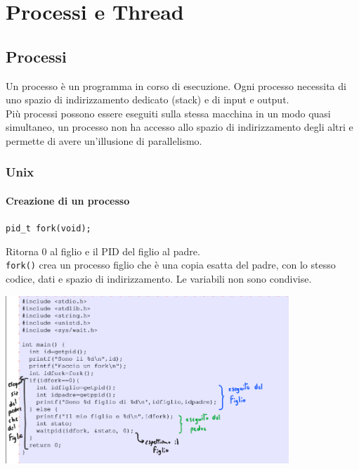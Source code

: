 \documentclass[12pt, a4paper]{report}
\begin{document}
    \newpage
    \tableofcontents
    \chapter{Processi e Thread}
        \section{Processi}
            Un processo è un programma in corso di esecuzione. Ogni processo necessita di uno spazio di indirizzamento dedicato (stack) e di input e output. \\
            Più processi possono essere eseguiti sulla stessa macchina in un modo quasi simultaneo, un processo non ha accesso allo spazio di indirizzamento degli altri e permette di avere un'illusione di parallelismo.
            \subsection{Unix}
                \subsubsection{Creazione di un processo}
                    \begin{center}
                        \texttt{pid\_t fork(void);}
                    \end{center}
                    Ritorna 0 al figlio e il PID del figlio al padre. \\
                    \texttt{fork()} crea un processo figlio che è una copia esatta del padre, con lo stesso codice, dati e spazio di indirizzamento. Le variabili non sono condivise.
                    \begin{center}
                        \includegraphics[width=0.8\textwidth]{Images/fork.png}
                    \end{center}
\end{document}
